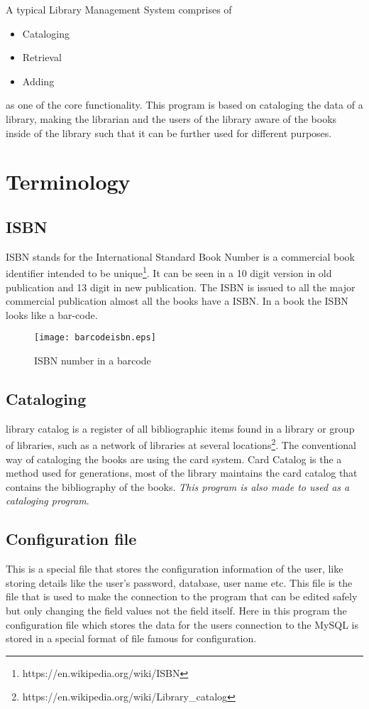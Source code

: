 \documentclass[12pt, a4paper, titlepage, openany]{report}
\begin{document}
A typical Library Management System comprises of
\begin{itemize}
\item Cataloging
\item Retrieval
\item Adding
\end{itemize}
as one of the core functionality. This program is based on cataloging the data of a library, making the librarian and the users of the library aware of the books inside of the library such that it can be further used for different purposes. 

\section{Terminology}
\subsection{ISBN}
ISBN stands for the International Standard Book Number is a commercial book identifier intended to be unique\footnote{https://en.wikipedia.org/wiki/ISBN}. It can be seen in a 10 digit version in old publication and 13 digit in new publication. The ISBN is issued to all the major commercial publication almost all the books have a ISBN. In a book the ISBN looks like a bar-code.
\begin{figure}
\centering
\texttt{[image: barcodeisbn.eps]}
\caption{ISBN number in a barcode}
\end{figure}

\subsection{Cataloging}
library catalog is a register of all bibliographic items found in a library or group of libraries, such as a network of libraries at several locations\footnote{https://en.wikipedia.org/wiki/Library\_catalog}. The conventional way of cataloging the books are using the card system. Card Catalog is the a method used for generations, most of the library maintains the card catalog that contains the bibliography of the books. \emph{This program is also made to used as a cataloging program}.

\subsection{Configuration file}
This is a special file that stores the configuration information of the user, like storing details like the user's password, database, user name etc. This file is the file that is used to make the connection to the program that can be edited safely but only changing the field values not the field itself. Here in this program the configuration file which stores the data for the users connection to the MySQL is stored in a special format of file famous for configuration.
\end{document}

